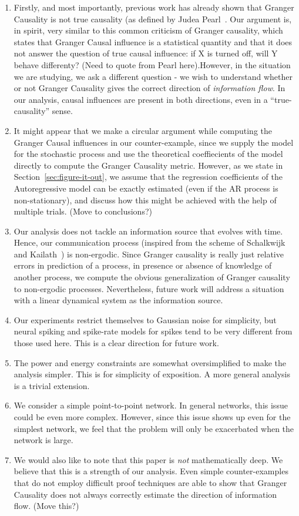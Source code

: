 \documentclass[conference]{IEEEtran}
\begin{document}
\begin{enumerate}
	\item Firstly, and most importantly, previous work has already shown that Granger Causality is not true causality (as defined by Judea Pearl~\cite{PearlCausalityBook}. Our argument is, in spirit, very similar to this common criticism of Granger causality, which states that Granger Causal influence is a statistical quantity and that it does not answer the question of true causal influence: if X is turned off, will Y behave differenty? {\color{red} (Need to quote from Pearl here)}.However, in the situation we are studying, we ask a different question - we wish to understand whether or not Granger Causality gives the correct direction of \emph{information flow}. In our analysis, causal influences are present in both directions, even in a ``true-causality'' sense.
	\item It might appear that we make a circular argument while computing the Granger Causal influences in our counter-example, since we supply the model for the stochastic process and use the theoretical coeffiecients of the model directly to compute the Granger Causality metric. However, as we state in Section~\ref{sec:figure-it-out}, we assume that the regression coefficients of the Autoregressive model can be exactly estimated (even if the AR process is non-stationary), and discuss how this might be achieved with the help of multiple trials. {\color{red} (Move to conclusions?)}
	\item Our analysis does not tackle an information source that evolves with time. Hence, our communication process (inspired from the scheme of Schalkwijk and Kailath~\cite{S&K}) is non-ergodic. Since Granger causality is really just relative errors in prediction of a process, in presence or absence of knowledge of another process, we compute the obvious generalization of Granger causality to non-ergodic processes. Nevertheless, future work will address a situation with a linear dynamical system as the information source.
	\item Our experiments restrict themselves to Gaussian noise for simplicity, but neural spiking and spike-rate models for spikes tend to be very different from those used here. This is a clear direction for future work.
	\item The power and energy constraints are somewhat oversimplified to make the analysis simpler. This is for simplicity of exposition. A more general analysis is a trivial extension.
	\item We consider a simple point-to-point network. In general networks, this issue could be even more complex. However, since this issue shows up even for the simplest network, we feel that the problem will only be exacerbated when the network is large.
	\item We would also like to note that this paper is \emph{not} mathematically deep. We believe that this is a strength of our analysis. Even simple counter-examples that do not employ difficult proof techniques are able to show that Granger Causality does not always correctly estimate the direction of information flow. {\color{red} (Move this?)}
\end{enumerate}
\end{document}
